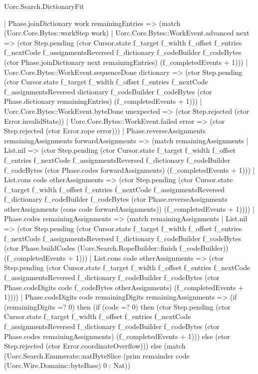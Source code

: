 \begin{lexlean}{Uorc.Search.DictionaryFit}
\begin{semanticmodule}
{      | Phase.joinDictionary work remainingEntries => (match (Uorc.Core.Bytes::workStep work)
        | Uorc.Core.Bytes::WorkEvent.advanced next => (ctor Step.pending (ctor Cursor.state f_target f_width f_offset f_entries f_nextCode f_assignmentsReversed f_dictionary f_codeBuilder f_codeBytes (ctor Phase.joinDictionary next remainingEntries) (f_completedEvents + 1)))
        | Uorc.Core.Bytes::WorkEvent.sequenceDone dictionary => (ctor Step.pending (ctor Cursor.state f_target f_width f_offset f_entries f_nextCode f_assignmentsReversed dictionary f_codeBuilder f_codeBytes (ctor Phase.dictionary remainingEntries) (f_completedEvents + 1)))
        | Uorc.Core.Bytes::WorkEvent.byteDone unexpected => (ctor Step.rejected (ctor Error.invalidState))
        | Uorc.Core.Bytes::WorkEvent.failed error => (ctor Step.rejected (ctor Error.rope error)))
      | Phase.reverseAssignments remainingAssignments forwardAssignments => (match remainingAssignments
        | List.nil => (ctor Step.pending (ctor Cursor.state f_target f_width f_offset f_entries f_nextCode f_assignmentsReversed f_dictionary f_codeBuilder f_codeBytes (ctor Phase.codes forwardAssignments) (f_completedEvents + 1)))
        | List.cons code otherAssignments => (ctor Step.pending (ctor Cursor.state f_target f_width f_offset f_entries f_nextCode f_assignmentsReversed f_dictionary f_codeBuilder f_codeBytes (ctor Phase.reverseAssignments otherAssignments (cons code forwardAssignments)) (f_completedEvents + 1))))
      | Phase.codes remainingAssignments => (match remainingAssignments
        | List.nil => (ctor Step.pending (ctor Cursor.state f_target f_width f_offset f_entries f_nextCode f_assignmentsReversed f_dictionary f_codeBuilder f_codeBytes (ctor Phase.buildCodes (Uorc.Search.RopeBuilder::finish f_codeBuilder)) (f_completedEvents + 1)))
        | List.cons code otherAssignments => (ctor Step.pending (ctor Cursor.state f_target f_width f_offset f_entries f_nextCode f_assignmentsReversed f_dictionary f_codeBuilder f_codeBytes (ctor Phase.codeDigits code f_codeBytes otherAssignments) (f_completedEvents + 1))))
      | Phase.codeDigits code remainingDigits remainingAssignments => (if (remainingDigits =? 0) then (if (code =? 0) then (ctor Step.pending (ctor Cursor.state f_target f_width f_offset f_entries f_nextCode f_assignmentsReversed f_dictionary f_codeBuilder f_codeBytes (ctor Phase.codes remainingAssignments) (f_completedEvents + 1))) else (ctor Step.rejected (ctor Error.coordinateOverflow))) else (match (Uorc.Search.Enumerate::natByteSlice (prim remainder code (Uorc.Wire.Domains::byteBase) 0 : Nat))
}
\end{semanticmodule}
\end{lexlean}
